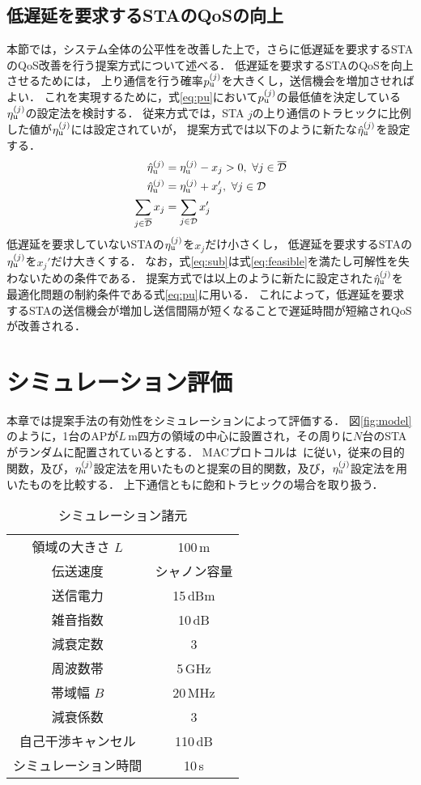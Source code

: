 \documentclass[technicalreport]{ieicej}
\newcommand{\etau}{\eta_{\rm u}^{(j)}}
\begin{document}
\subsection{低遅延を要求するSTAのQoSの向上}
	本節では，システム全体の公平性を改善した上で，さらに低遅延を要求するSTAのQoS改善を行う提案方式について述べる．
	低遅延を要求するSTAのQoSを向上させるためには，
	上り通信を行う確率$p_{\rm u}^{(j)}$を大きくし，送信機会を増加させればよい．
	これを実現するために，式\eqref{eq:pu}において$p_{\rm u}^{(j)}$の最低値を決定している$\etau$の設定法を検討する．
	従来方式では，STA $j$の上り通信のトラヒックに比例した値が$\etau$には設定されていが，
	提案方式では以下のように新たな${\hat \eta}_{\rm u}^{(j)}$を設定する．
	\begin{align}
		{\hat \eta}_{\rm u}^{(j)} &= \etau -x_j > 0,\ \forall j \in {\overline {\mathcal D}} \label{eq:etadbar}\\
		{\hat \eta}_{\rm u}^{(j)} &= \etau + x_j',\ \forall j \in {\mathcal D} \label{eq:etad}\\
		\sum_{j\in{\overline {\mathcal D}}} x_j &= \sum_{j\in{\mathcal D}} x_j' \label{eq:sub}
	\end{align}
	低遅延を要求していないSTAの$\etau$を$x_j$だけ小さくし，
	低遅延を要求するSTAの$\etau$を$x_j'$だけ大きくする．
	なお，式\eqref{eq:sub}は式\eqref{eq:feasible}を満たし可解性を失わないための条件である．
	提案方式では以上のように新たに設定された${\hat \eta}_{\rm u}^{(j)}$を最適化問題の制約条件である式\eqref{eq:pu}に用いる．
	これによって，低遅延を要求するSTAの送信機会が増加し送信間隔が短くなることで遅延時間が短縮されQoSが改善される．

\section{シミュレーション評価}
	本章では提案手法の有効性をシミュレーションによって評価する．
	図\ref{fig:model}のように，1台のAPが$L$\,m四方の領域の中心に設置され，その周りに$N$台のSTAがランダムに配置されているとする．
	MACプロトコルは~\cite{promac}に従い，従来の目的関数，及び，$\etau$設定法を用いたものと提案の目的関数，及び，$\etau$設定法を用いたものを比較する．
	上下通信ともに飽和トラヒックの場合を取り扱う．

	\begin{table}[t]
		\centering
		\caption{シミュレーション諸元}
		\label{tab:param}
		\begin{tabular}{cc} \hline
			領域の大きさ $L$ & 100\,m \\
			伝送速度 & シャノン容量 \\
			送信電力 & 15\,dBm \\
			雑音指数 & 10\,dB \\
			減衰定数 & 3 \\
			周波数帯 & 5\,GHz \\
			帯域幅 $B$ & 20\,MHz \\
			減衰係数 & 3 \\
			自己干渉キャンセル & 110\,dB \\
			シミュレーション時間 & 10\,s \\\hline
		\end{tabular}
	\end{table}
\end{document}
